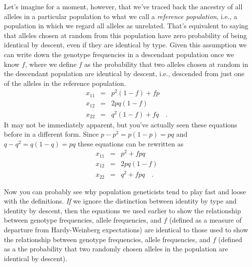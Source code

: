 Let's imagine for a moment, however, that we've traced back the
ancestry of all alleles in a particular population to what we call a
{\it reference population\/}, i.e., a population in which we regard
all alleles as unrelated. That's equivalent
to saying that alleles chosen at random from this population have zero
probability of being identical by descent, even if they are identical
by type. Given this assumption we
can write down the genotype frequencies in a descendant population
once we know $f$, where we define $f$ as the probability that two
alleles chosen at random in the descendant population are identical by
descent, i.e., descended from just one of the alleles in the reference
population.
\begin{eqnarray}
x_{11} &=& p^2(1-f) + fp \\
x_{12} &=& 2pq(1-f) \\
x_{22} &=& q^2(1-f) + fq \quad .
\end{eqnarray}
It may not be immediately apparent, but you've actually seen these
equations before in a different form.  Since $p - p^2 = p(1-p) = pq$
and $q - q^2 = q(1-q) = pq$ these equations can be rewritten as
\begin{eqnarray}
x_{11} &=& p^2 + fpq \\
x_{12} &=& 2pq(1-f) \\
x_{22} &=& q^2 + fpq \quad .
\end{eqnarray}

Now you can probably see why population geneticists tend to play fast
and loose with the definitions. {\it If\/} we ignore the distinction
between identity by type and identity by descent, then the equations
we used earlier to show the relationship between genotype frequencies,
allele frequencies, and $f$ (defined as a measure of departure from
Hardy-Weinberg expectations) are identical to those used to show the
relationship between genotype frequencies, allele frequencies, and $f$
(defined as a the probability that two randomly chosen alleles in the
population are identical by descent).

